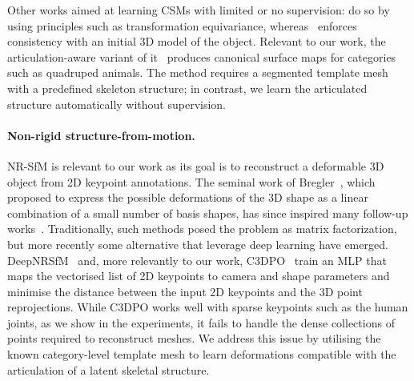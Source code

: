 Other works aimed at learning CSMs with limited or no supervision:
{}\cite{thewlis17dense,thewlis19unsupervised,schmidt17self-supervised} do so by using principles such as transformation equivariance, whereas~\cite{kulkarni19canonical} enforces consistency with an initial 3D model of the object.
Relevant to our work, the articulation-aware variant of it~\cite{Kulkarni2020} produces canonical surface maps for categories such as quadruped animals.
The method requires a segmented template mesh with a predefined skeleton structure; in contrast, we learn the articulated structure automatically without supervision.

\paragraph{Non-rigid structure-from-motion.}

NR-SfM is relevant to our work as its goal is to reconstruct a deformable 3D object from 2D keypoint annotations.
The seminal work of Bregler~\cite{bregler00recovering}, which proposed to express the possible deformations of the 3D shape as a linear combination of a small number of basis shapes, has since inspired many follow-up works~\cite{agudo2018image, fragkiadaki2014grouping, dai2014simple, zhu2014complex, akhter2009nonrigid, akhter2011trajectory, agudo2017dust, gotardo2011non, kumar2018scalable, kumar2017spatial, zhu2014complex, agudo2018deformable, zhou2016sparseness, zhou2016sparse, torresani2008nonrigid}.
Traditionally, such methods posed the problem as matrix factorization, but more recently some alternative that leverage deep learning have emerged.
DeepNRSfM~\cite{kong2019deep, wang2020deep} and, more relevantly to our work, C3DPO~\cite{novotny19c3dpo} train an MLP that maps the vectorised list of 2D keypoints to camera and shape parameters and minimise the distance between the input 2D keypoints and the 3D point reprojections.
While C3DPO works well with sparse keypoints such as the human joints, as we show in the experiments, it fails to handle the dense collections of points required to reconstruct meshes.
We address this issue by utilising the known category-level template mesh to learn deformations compatible with the articulation of a latent skeletal structure.
